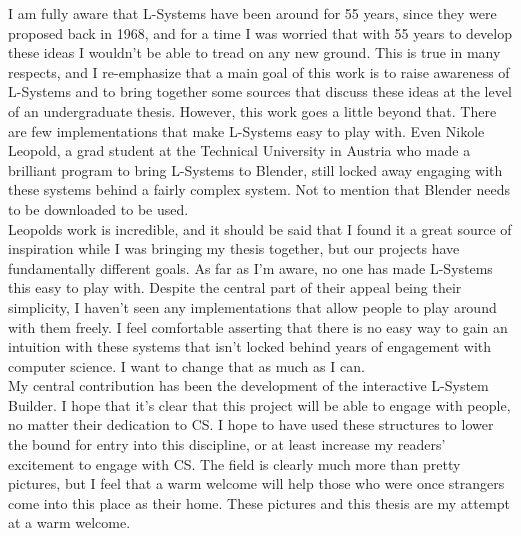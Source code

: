 \documentclass[12pt,twoside]{reedthesis}
\begin{document}
	I am fully aware that L-Systems have been around for 55 years, since they were proposed back in 1968, and for a time I was worried that with 55 years to develop these ideas I wouldn't be able to tread on any new ground. This is true in many respects, and I re-emphasize that a main goal of this work is to raise awareness of L-Systems and to bring together some sources that discuss these ideas at the level of an undergraduate thesis. However, this work goes a little beyond that. There are few implementations that make L-Systems easy to play with. Even Nikole Leopold, a grad student at the Technical University in Austria who made a brilliant program to bring L-Systems to Blender, still locked away engaging with these systems behind a fairly complex system. Not to mention that Blender needs to be downloaded to be used.\\
	
	Leopolds work is incredible, and it should be said that I found it a great source of inspiration while I was bringing my thesis together, but our projects have fundamentally different goals. As far as I'm aware, no one has made L-Systems this easy to play with. Despite the central part of their appeal being their simplicity, I haven't seen any implementations that allow people to play around with them freely. I feel comfortable asserting that there is no easy way to gain an intuition with these systems that isn't locked behind years of engagement with computer science. I want to change that as much as I can.\\
	
	My central contribution has been the development of the interactive L-System Builder. I hope that it's clear that this project will be able to engage with people, no matter their dedication to CS. I hope to have used these structures to lower the bound for entry into this discipline, or at least increase my readers’ excitement to engage with CS. The field is clearly much more than pretty pictures, but I feel that a warm welcome will help those who were once strangers come into this place as their home. These pictures and this thesis are my attempt at a warm welcome.\\
	
\end{document}
